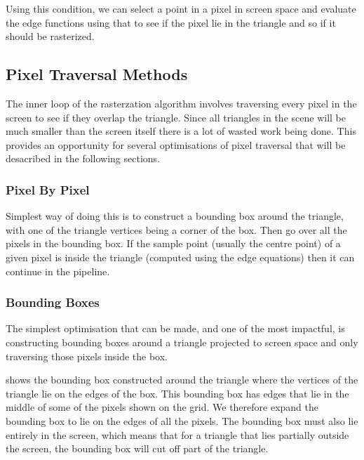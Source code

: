 Using this condition, we can select a point in a pixel in screen space and evaluate the edge functions using that to see if the pixel lie in the triangle and so if it should be rasterized.

\subsection{Pixel Traversal Methods}
The inner loop of the rasterzation algorithm involves traversing every pixel in the screen to see if they overlap the triangle. Since all triangles in the scene will be much smaller than the screen itself there is a lot of wasted work being done.
This provides an opportunity for several optimisations of pixel traversal that will be desacribed in the following sections.

\subsubsection{Pixel By Pixel}
Simplest way of doing this is to construct a bounding box around the triangle, with one of the triangle vertices being a corner of the box.
Then go over all the pixels in the bounding box. If the sample point (usually the centre point) of a given pixel is inside the triangle (computed using the edge equations) then it can continue in the pipeline.

\subsubsection{Bounding Boxes}
The simplest optimisation that can be made, and one of the most impactful, is constructing bounding boxes around a triangle projected to screen space and only traversing those pixels inside the box.

 shows the bounding box constructed around the triangle where the vertices of the triangle lie on the edges of the box. This bounding box has edges that lie in the middle of some of the pixels shown on the grid. We therefore expand the bounding box to lie on the edges of all the pixels. The bounding box must also lie entirely in the screen, which means that for a triangle that lies partially outside the screen, the bounding box will cut off part of the triangle.

